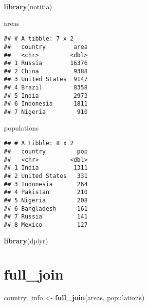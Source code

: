 \documentclass[]{book}
\newenvironment{Shaded}{\begin{snugshade}}{\end{snugshade}}
\newcommand{\KeywordTok}[1]{\textcolor[rgb]{0.13,0.29,0.53}{\textbf{#1}}}
\newcommand{\NormalTok}[1]{#1}
\newcommand{\StringTok}[1]{\textcolor[rgb]{0.31,0.60,0.02}{#1}}
\begin{document}
\begin{Shaded}
\begin{Highlighting}[]
\KeywordTok{library}\NormalTok{(notitia)}
\end{Highlighting}
\end{Shaded}

\begin{Shaded}
\begin{Highlighting}[]
\NormalTok{areas}
\end{Highlighting}
\end{Shaded}

\begin{verbatim}
## # A tibble: 7 x 2
##   country        area
##   <chr>         <dbl>
## 1 Russia        16376
## 2 China          9388
## 3 United States  9147
## 4 Brazil         8358
## 5 India          2973
## 6 Indonesia      1811
## 7 Nigeria         910
\end{verbatim}

\begin{Shaded}
\begin{Highlighting}[]
\NormalTok{populations}
\end{Highlighting}
\end{Shaded}

\begin{verbatim}
## # A tibble: 8 x 2
##   country         pop
##   <chr>         <dbl>
## 1 India          1311
## 2 United States   331
## 3 Indonesia       264
## 4 Pakistan        210
## 5 Nigeria         208
## 6 Bangladesh      161
## 7 Russia          141
## 8 Mexico          127
\end{verbatim}

\begin{Shaded}
\begin{Highlighting}[]
\KeywordTok{library}\NormalTok{(dplyr)}
\end{Highlighting}
\end{Shaded}

\hypertarget{fulljoin}{%
\section*{\texorpdfstring{\textbf{full\_join}}{full\_join}}\label{fulljoin}}

\begin{Shaded}
\begin{Highlighting}[]
\NormalTok{country_info <-}\StringTok{ }\KeywordTok{full_join}\NormalTok{(areas, populations)}
\end{Highlighting}
\end{Shaded}
\end{document}
